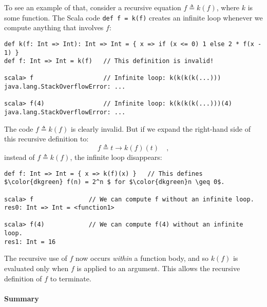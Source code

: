 To see an example of that, consider a recursive equation $f\triangleq k(f)$,
where $k$ is some function. The Scala code \lstinline!def f = k(f)!
creates an infinite loop whenever we compute anything that involves
$f$:
\begin{lstlisting}[mathescape=true]
def k(f: Int => Int): Int => Int = { x => if (x <= 0) 1 else 2 * f(x - 1) }
def f: Int => Int = k(f)   // This definition is invalid!

scala> f                   // Infinite loop: k(k(k(k(...)))
java.lang.StackOverflowError: ...

scala> f(4)                // Infinite loop: k(k(k(k(...)))(4)
java.lang.StackOverflowError: ...
\end{lstlisting}
The code $f\triangleq k(f)$ is clearly invalid. But if we expand
the right-hand side of this recursive definition to:
\[
f\triangleq t\rightarrow k(f)(t)\quad,
\]
instead of $f\triangleq k(f)$, the infinite loop disappears:
\begin{lstlisting}[mathescape=true]
def f: Int => Int = { x => k(f)(x) }   // This defines $\color{dkgreen} f(n) = 2^n $ for $\color{dkgreen}n \geq 0$.

scala> f               // We can compute f without an infinite loop.
res0: Int => Int = <function1>

scala> f(4)            // We can compute f(4) without an infinite loop.
res1: Int = 16
\end{lstlisting}
The recursive use of $f$ now occurs \emph{within} a function body,
and so $k(f)$ is evaluated only when $f$ is applied to an argument.
This allows the recursive definition of $f$ to terminate.

\paragraph{Summary}

